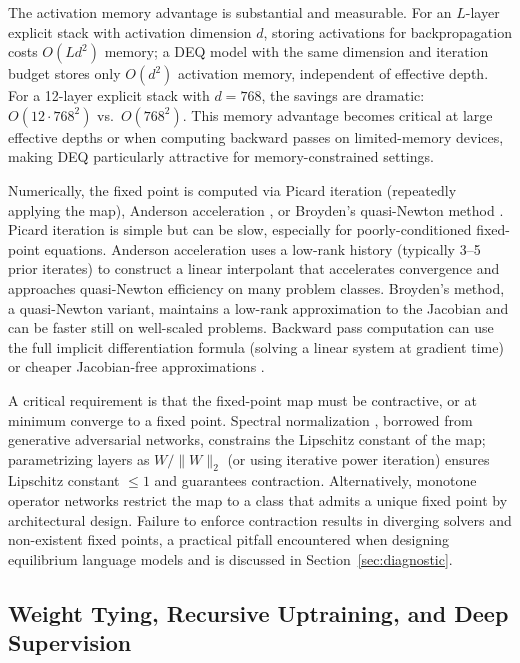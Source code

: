 The activation memory advantage is substantial and measurable.
For an $L$-layer explicit stack with activation dimension $d$, storing activations for backpropagation costs
$O(Ld^2)$ memory; a DEQ model with the same dimension and iteration budget stores only $O(d^2)$ activation
memory, independent of effective depth.
For a 12-layer explicit stack with $d=768$, the savings are dramatic: $O(12 \cdot 768^2)$ vs.~$O(768^2)$.
This memory advantage becomes critical at large effective depths or when computing backward passes on
limited-memory devices, making DEQ particularly attractive for memory-constrained settings.

Numerically, the fixed point is computed via Picard iteration (repeatedly applying the map), Anderson
acceleration \citep{Anderson1965}, or Broyden's quasi-Newton method \citep{Broyden1965}.
Picard iteration is simple but can be slow, especially for poorly-conditioned fixed-point equations.
Anderson acceleration uses a low-rank history (typically 3--5 prior iterates) to construct a linear
interpolant that accelerates convergence and approaches quasi-Newton efficiency on many problem classes.
Broyden's method, a quasi-Newton variant, maintains a low-rank approximation to the Jacobian and can be faster
still on well-scaled problems.
Backward pass computation can use the full implicit differentiation formula (solving a linear system at
gradient time) or cheaper Jacobian-free approximations \citep{Geng2021}.

A critical requirement is that the fixed-point map must be contractive, or at minimum converge to a fixed
point.
Spectral normalization \citep{Miyato2018}, borrowed from generative adversarial networks, constrains the
Lipschitz constant of the map; parametrizing layers as $W / \|W\|_2$ (or using iterative power iteration)
ensures Lipschitz constant $\leq 1$ and guarantees contraction.
Alternatively, monotone operator networks \citep{Winston2020} restrict the map to a class that admits a unique
fixed point by architectural design.
Failure to enforce contraction results in diverging solvers and non-existent fixed points, a practical pitfall
encountered when designing equilibrium language models and is discussed in Section~\ref{sec:diagnostic}.

\subsection{Weight Tying, Recursive Uptraining, and Deep Supervision}

